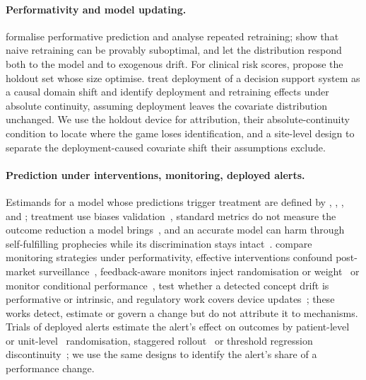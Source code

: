 \documentclass[letterpaper]{article} %
\begin{document}
\paragraph{Performativity and model updating.} \citet{perdomo2020performative}
formalise performative prediction and analyse repeated retraining;
\citet{kabra2024limitations} show that naive retraining can be provably
suboptimal, and \citet{lee2026partially} let the distribution respond both to
the model and to exogenous drift. For clinical risk scores,
\citet{liley2021model} propose the holdout set whose size
\citet{haidarwehbe2025holdout} optimise. \citet{boeken2024evaluating} treat
deployment of a decision support system as a causal domain shift and identify
deployment and retraining effects under absolute continuity, assuming
deployment leaves the covariate distribution unchanged. We use the holdout
device for attribution, their absolute-continuity condition to locate where
the game loses identification, and a site-level design to separate the
deployment-caused covariate shift their assumptions exclude.

\paragraph{Prediction under interventions, monitoring, deployed alerts.}
Estimands for a model whose predictions trigger treatment are defined by
\citet{sperrin2018msm}, \citet{vangeloven2020prediction},
\citet{lin2021scoping}, \citet{keogh2024prediction} and
\citet{luijken2024estimands}; treatment use biases
validation~\citep{pajouheshnia2017accounting}, standard metrics do not measure
the outcome reduction a model brings~\citep{schuler2020performance}, and an
accurate model can harm through self-fulfilling prophecies while its
discrimination stays intact~\citep{vanamsterdam2025selffulfilling}.
\citet{feng2024designing} compare monitoring strategies under performativity,
effective interventions confound post-market
surveillance~\citep{ansari2025challenges}, feedback-aware monitors inject
randomisation or weight~\citep{corbin2023avoiding, kim2025monitoring} or
monitor conditional performance~\citep{feng2024monitoring, guan2026detecting},
\citet{gowerwinter2025performative} test whether a detected concept drift is
performative or intrinsic, and regulatory work covers device
updates~\citep{wu2024regulating, gonzalez2024regulating, afdideh2026aegis};
these works detect, estimate or govern a change but do not attribute it to
mechanisms. Trials of deployed alerts estimate the alert's effect on
outcomes by patient-level~\citep{wilson2021aki} or
unit-level~\citep{rossetti2025concern} randomisation, staggered
rollout~\citep{escobar2020automated} or threshold regression
discontinuity~\citep{gallo2024effectiveness}; we use the same designs to
identify the alert's share of a performance change.
\end{document}
